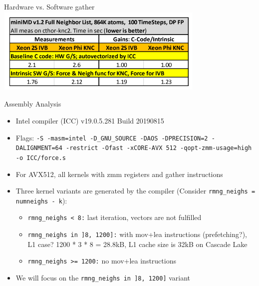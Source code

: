 \documentclass[aspectratio=43,t]{beamer}
\begin{document}
  \begin{frame}[fragile]{Hardware vs. Software gather}
  \centering
    \includegraphics[width=10cm]{minimd_hw_vs_sw_results_table.png}
  \end{frame}

  \begin{frame}[fragile]{Assembly Analysis}
    \begin{itemize}
      \item Intel compiler (ICC) v19.0.5.281 Build 20190815
      \item Flags: \texttt{-S -masm=intel -D\_GNU\_SOURCE -DAOS -DPRECISION=2 -DALIGNMENT=64 -restrict -Ofast -xCORE-AVX 512 -qopt-zmm-usage=high -o ICC/force.s}
      \item For AVX512, all kernels with zmm registers and gather instructions
      \item Three kernel variants are generated by the compiler (Consider \texttt{rmng\_neighs = numneighs - k}):
      \begin{itemize}
        \item \texttt{rmng\_neighs < 8:} last iteration, vectors are not fulfilled
        \item \texttt{rmng\_neighs in ]8, 1200]:} with mov+lea instructions (prefetching?), L1 case? 1200 * 3 * 8 = 28.8kB, L1 cache size is 32kB on Cascade Lake
        \item \texttt{rmng\_neighs >= 1200:} no mov+lea instructions
      \end{itemize}
      \item We will focus on the \texttt{rmng\_neighs in ]8, 1200]} variant
    \end{itemize}
  \end{frame}
\end{document}
